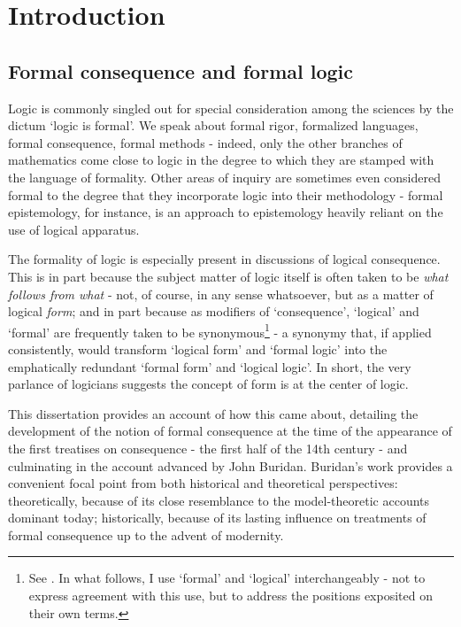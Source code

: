 \chapter{Introduction}


	
	\section{Formal consequence and formal logic}
	Logic is commonly singled out for special consideration among the sciences by the dictum `logic is formal'. We speak about formal rigor, formalized languages, formal consequence, formal methods - indeed, only the other branches of mathematics come close to logic in the degree to which they are stamped with the language of formality. Other areas of inquiry are sometimes even considered formal to the degree that they incorporate logic into their methodology - formal epistemology, for instance, is an approach to epistemology heavily reliant on the use of logical apparatus.
	
	The formality of logic is especially present in discussions of logical consequence. This is in part because the subject matter of logic itself is often taken to be \textit{what follows from what} - not, of course, in any sense whatsoever, but as a matter of logical \textit{form}; and in part because as modifiers of `consequence', `logical' and `formal' are frequently taken to be synonymous\footnote{See \cite[188, 193]{Tarski2002}. In what follows, I use `formal' and `logical' interchangeably - not to express agreement with this use, but to address the positions exposited on their own terms.} - a synonymy that, if applied consistently, would transform `logical form' and `formal logic' into the emphatically redundant `formal form' and `logical logic'. In short, the very parlance of logicians suggests the concept of form is at the center of logic.
	
	This dissertation provides an account of how this came about, detailing the development of the notion of formal consequence at the time of the appearance of the first treatises on consequence - the first half of the 14th century - and culminating in the account advanced by John Buridan. Buridan's work provides a convenient focal point from both historical and theoretical perspectives: theoretically, because of its close resemblance to the model-theoretic accounts dominant today; historically, because of its lasting influence on treatments of formal consequence up to the advent of modernity.
	
